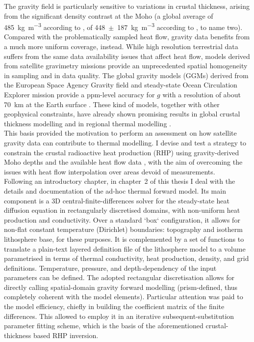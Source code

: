 The gravity field is particularly sensitive to variations in crustal thickness, arising from the significant density contrast at the Moho (a global average of \SI{485}{\kilo \gram \per \cubic \metre} according to \cite{Tenzer2012}, of \num{448}~$\pm$~\SI{187}{\kilo \gram \per \cubic \metre} according to \cite{Sjoberg2011}, to name two).
Compared with the problematically sampled heat flow, gravity data benefits from a much more uniform coverage, instead.
While high resolution terrestrial data suffers from the same data availability issues that affect heat flow, models derived from satellite gravimetry missions provide an unprecedented spatial homogeneity in sampling and in data quality.
The global gravity models (GGMs) derived from the European Space Agency Gravity field and steady-state Ocean Circulation Explorer mission \parencite[GOCE,][]{Floberghagen2011_goce} provide a ppm-level accuracy for $g$ with a resolution of about \SI{70}{\kilo \metre} at the Earth surface \parencites{Brockmann2014}{Kvas_GOCO06s_dataset}.
These kind of models, together with other geophysical constraints, have already shown promising results in global crustal thickness modelling \parencites[e.g.][]{Eshagh2011}{Reguzzoni2015} and in regional thermal modelling \parencite{Bouman2015}.
\\

This basis provided the motivation to perform an assessment on how satellite gravity data can contribute to thermal modelling.
I devise and test a strategy to constrain the crustal radioactive heat production (RHP) using gravity-derived Moho depths and the available heat flow data \parencite{globalHF}, with the aim of overcoming the issues with heat flow interpolation over areas devoid of measurements.
\\

Following an introductory chapter, in chapter~2 of this thesis I deal with the details and documentation of the ad-hoc thermal forward model.
Its main component is a 3D central-finite-differences solver for the steady-state heat diffusion equation in rectangularly discretised domains, with non-uniform heat production and conductivity.
Over a standard `box` configuration, it allows for non-flat constant temperature (Dirichlet) boundaries: topography and isotherm lithosphere base, for these purposes.
It is complemented by a set of functions to translate a plain-text layered definition file of the lithosphere model to a volume parametrised in terms of thermal conductivity, heat production, density, and grid definitions.
Temperature, pressure, and depth-dependency of the input parameters can be defined.
The adopted rectangular discretisation allows for directly calling spatial-domain gravity forward modelling (prism-defined, thus completely coherent with the model elements).
Particular attention was paid to the model efficiency, chiefly in building the coefficient matrix of the finite differences.
This allowed to employ it in an iterative subsequent-substitution parameter fitting scheme, which is the basis of the aforementioned crustal-thickness based RHP inversion.
\\

